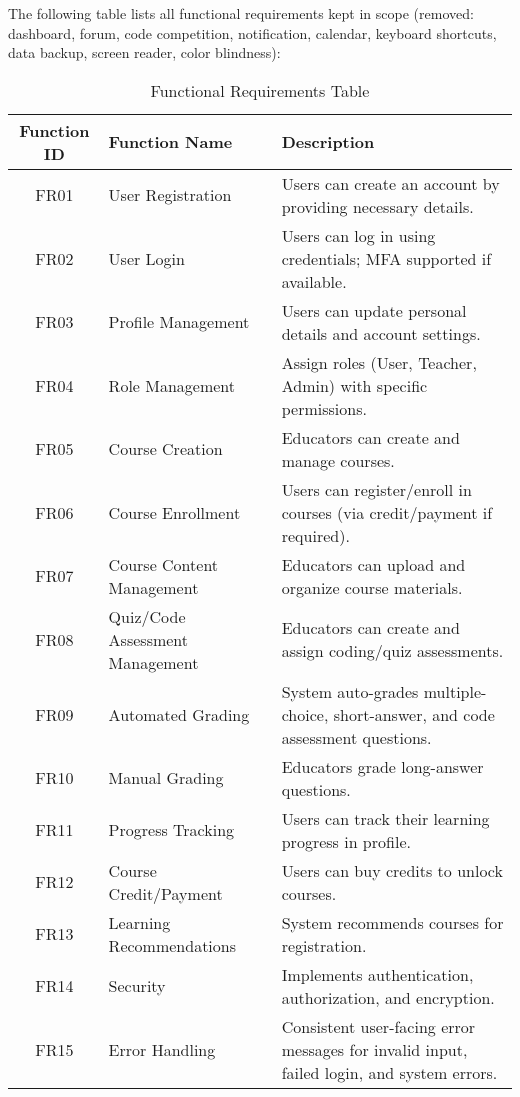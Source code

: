 \documentclass[a4paper, 11pt]{scrreprt}
\begin{document}
The following table lists all functional requirements kept in scope (removed: dashboard, forum, code competition, notification, calendar, keyboard shortcuts, data backup, screen reader, color blindness):

\begin{table}[h!]
    \centering
    \begin{tabular}{|c|l|p{10cm}|}
    \hline
    \textbf{Function ID} & \textbf{Function Name} & \textbf{Description} \\
    \hline
    FR01 & User Registration & Users can create an account by providing necessary details. \\
    FR02 & User Login & Users can log in using credentials; MFA supported if available. \\
    FR03 & Profile Management & Users can update personal details and account settings. \\
    FR04 & Role Management & Assign roles (User, Teacher, Admin) with specific permissions. \\
    FR05 & Course Creation & Educators can create and manage courses. \\
    FR06 & Course Enrollment & Users can register/enroll in courses (via credit/payment if required). \\
    FR07 & Course Content Management & Educators can upload and organize course materials. \\
    FR08 & Quiz/Code Assessment Management & Educators can create and assign coding/quiz assessments. \\
    FR09 & Automated Grading & System auto-grades multiple-choice, short-answer, and code assessment questions. \\
    FR10 & Manual Grading & Educators grade long-answer questions. \\
    FR11 & Progress Tracking & Users can track their learning progress in profile. \\
    FR12 & Course Credit/Payment & Users can buy credits to unlock courses. \\
    FR13 & Learning Recommendations & System recommends courses for registration. \\
    FR14 & Security & Implements authentication, authorization, and encryption. \\
    FR15 & Error Handling & Consistent user-facing error messages for invalid input, failed login, and system errors. \\
    \hline
    \end{tabular}
    \caption{Functional Requirements Table}
\end{table}
\end{document}
